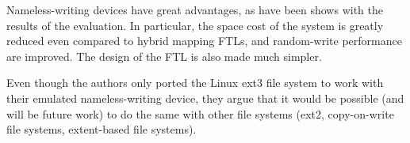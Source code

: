 \documentclass[twocolumn,a4paper,10pt]{article}
\begin{document}
Nameless-writing devices have great advantages, as have been shows with the
results of the evaluation. In particular, the space cost of the system is
greatly reduced even compared to hybrid mapping FTLs, and random-write
performance are improved. The design of the FTL is also made much simpler.

Even though the authors only ported the Linux ext3 file system to work with
their emulated nameless-writing device, they argue that it would be possible
(and will be future work) to do the same with other file systems (ext2,
copy-on-write file systems, extent-based file systems).
\end{document}
